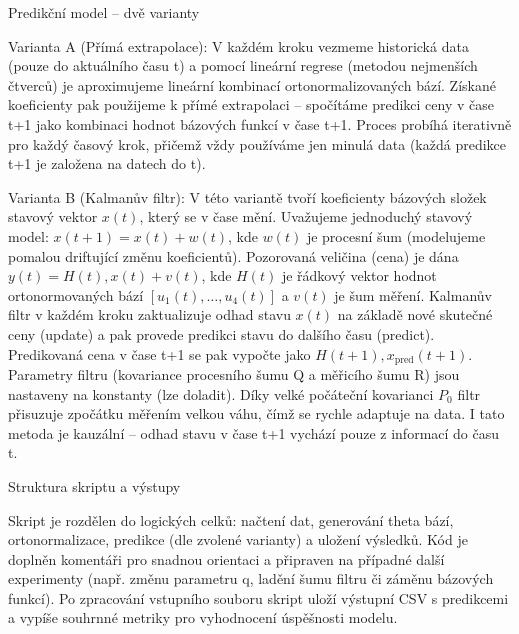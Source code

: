 Predikční model – dvě varianty

Varianta A (Přímá extrapolace): V každém kroku vezmeme historická data (pouze do aktuálního času t) a pomocí lineární regrese (metodou nejmenších čtverců) je aproximujeme lineární kombinací ortonormalizovaných bází. Získané koeficienty pak použijeme k přímé extrapolaci – spočítáme predikci ceny v čase t+1 jako kombinaci hodnot bázových funkcí v čase t+1. Proces probíhá iterativně pro každý časový krok, přičemž vždy používáme jen minulá data (každá predikce t+1 je založena na datech do t).

Varianta B (Kalmanův filtr): V této variantě tvoří koeficienty bázových složek stavový vektor $x(t)$, který se v čase mění. Uvažujeme jednoduchý stavový model: $x(t+1) = x(t) + w(t)$, kde $w(t)$ je procesní šum (modelujeme pomalou driftující změnu koeficientů). Pozorovaná veličina (cena) je dána $y(t) = H(t),x(t) + v(t)$, kde $H(t)$ je řádkový vektor hodnot ortonormovaných bází $[u_1(t), \dots, u_4(t)]$ a $v(t)$ je šum měření. Kalmanův filtr v každém kroku zaktualizuje odhad stavu $x(t)$ na základě nové skutečné ceny (update) a pak provede predikci stavu do dalšího času (predict). Predikovaná cena v čase t+1 se pak vypočte jako $H(t+1),x_{\text{pred}}(t+1)$. Parametry filtru (kovariance procesního šumu Q a měřicího šumu R) jsou nastaveny na konstanty (lze doladit). Díky velké počáteční kovarianci $P_0$ filtr přisuzuje zpočátku měřením velkou váhu, čímž se rychle adaptuje na data. I tato metoda je kauzální – odhad stavu v čase t+1 vychází pouze z informací do času t.

Struktura skriptu a výstupy

Skript je rozdělen do logických celků: načtení dat, generování theta bází, ortonormalizace, predikce (dle zvolené varianty) a uložení výsledků. Kód je doplněn komentáři pro snadnou orientaci a připraven na případné další experimenty (např. změnu parametru q, ladění šumu filtru či záměnu bázových funkcí). Po zpracování vstupního souboru skript uloží výstupní CSV s predikcemi a vypíše souhrnné metriky pro vyhodnocení úspěšnosti modelu.
